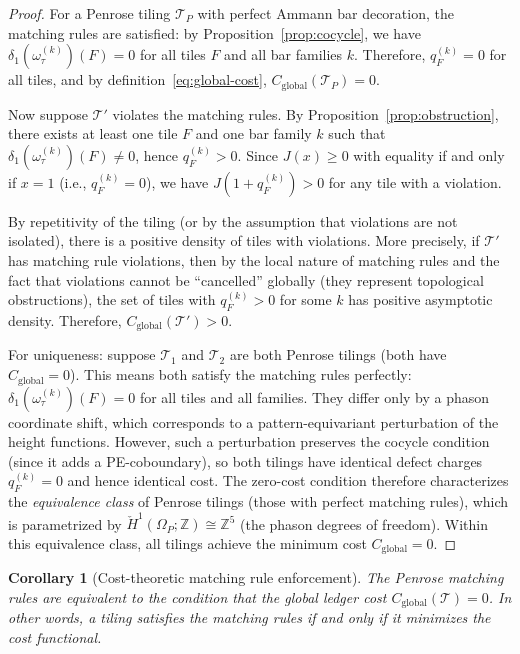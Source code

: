 \documentclass[12pt]{article}
\newtheorem{corollary}[theorem]{Corollary}
\theoremstyle{definition}
\theoremstyle{remark}
\newcommand{\ZZ}{\mathbb{Z}}
\begin{document}
\begin{proof}
For a Penrose tiling $\mathcal{T}_P$ with perfect Ammann bar decoration, the matching rules are satisfied: by Proposition~\ref{prop:cocycle}, we have $\delta_1(\omega_\tau^{(k)})(F) = 0$ for all tiles $F$ and all bar families $k$. Therefore, $q_F^{(k)} = 0$ for all tiles, and by definition~\eqref{eq:global-cost}, $C_{\text{global}}(\mathcal{T}_P) = 0$.

Now suppose $\mathcal{T}'$ violates the matching rules. By Proposition~\ref{prop:obstruction}, there exists at least one tile $F$ and one bar family $k$ such that $\delta_1(\omega_\tau^{(k)})(F) \neq 0$, hence $q_F^{(k)} > 0$. Since $J(x) \geq 0$ with equality if and only if $x = 1$ (i.e., $q_F^{(k)} = 0$), we have $J(1 + q_F^{(k)}) > 0$ for any tile with a violation.

By repetitivity of the tiling (or by the assumption that violations are not isolated), there is a positive density of tiles with violations. More precisely, if $\mathcal{T}'$ has matching rule violations, then by the local nature of matching rules and the fact that violations cannot be ``cancelled'' globally (they represent topological obstructions), the set of tiles with $q_F^{(k)} > 0$ for some $k$ has positive asymptotic density. Therefore, $C_{\text{global}}(\mathcal{T}') > 0$.

For uniqueness: suppose $\mathcal{T}_1$ and $\mathcal{T}_2$ are both Penrose tilings (both have $C_{\text{global}} = 0$). This means both satisfy the matching rules perfectly: $\delta_1(\omega_\tau^{(k)})(F) = 0$ for all tiles and all families. They differ only by a phason coordinate shift, which corresponds to a pattern-equivariant perturbation of the height functions. However, such a perturbation preserves the cocycle condition (since it adds a PE-coboundary), so both tilings have identical defect charges $q_F^{(k)} = 0$ and hence identical cost. The zero-cost condition therefore characterizes the \emph{equivalence class} of Penrose tilings (those with perfect matching rules), which is parametrized by $\check{H}^1(\Omega_P; \ZZ) \cong \ZZ^5$ (the phason degrees of freedom). Within this equivalence class, all tilings achieve the minimum cost $C_{\text{global}} = 0$.
\end{proof}

\begin{corollary}[Cost-theoretic matching rule enforcement]
\label{cor:cost-matching}
The Penrose matching rules are equivalent to the condition that the global ledger cost $C_{\text{global}}(\mathcal{T}) = 0$. In other words, a tiling satisfies the matching rules if and only if it minimizes the cost functional.
\end{corollary}
\end{document}
